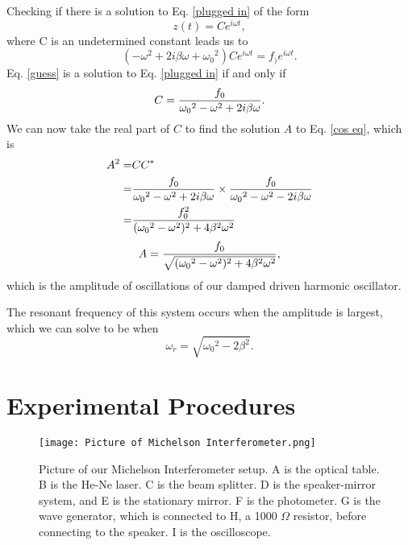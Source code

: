 \documentclass[11pt,letterpaper]{article}
\begin{document}
Checking if there is a solution to Eq. \eqref{plugged in} of the form
\begin{equation}
    z(t) = Ce^{i \omega t} , \label{guess}
\end{equation}
where C is an undetermined constant leads us to
\begin{equation}
    (-\omega ^2 + 2 i \beta \omega + {\omega _0}^2) C e^{i \omega t} = f_) e^{i \omega t} . 
\end{equation}
Eq. \eqref{guess} is a solution to Eq. \eqref{plugged in} if and only if
\begin{equation}
    C = {f_0 \over {\omega _0}^2 - \omega ^2 + 2 i \beta \omega} .
\end{equation}
We can now take the real part of $C$ to find the solution $A$ to Eq. \eqref{cos eq}, which is
\begin{align}
    A^2 = & CC^* \\
    = & {f_0 \over {\omega _0}^2 - \omega ^2 + 2 i \beta \omega} \times {f_0 \over {\omega _0}^2 - \omega ^2 - 2 i \beta \omega} \\
    = & {f_0^2 \over ({\omega _0}^2 - \omega ^2)^2 + 4 \beta ^2 \omega ^2}
\end{align}
\begin{equation}
    A = {f_0 \over \sqrt{({\omega _0}^2 - \omega ^2)^2 + 4 \beta ^2 \omega ^2}} , \label{Amplitude}
\end{equation}
which is the amplitude of oscillations of our damped driven harmonic oscillator.

The resonant frequency of this system occurs when the amplitude is largest, which we can solve to be when
\begin{equation}
    \omega _r = \sqrt{{\omega _0}^2 - 2 \beta ^2} . \label{resonant freq}
\end{equation}


\section{Experimental Procedures}

\begin{figure}
\centerline{\texttt{[image: Picture of Michelson Interferometer.png]}}
\caption{Picture of our Michelson Interferometer setup. A is the optical table. B is the He-Ne laser. C is the beam splitter. D is the speaker-mirror system, and E is the stationary mirror. F is the photometer. G is the wave generator, which is connected to H, a 1000 $\Omega$ resistor, before connecting to the speaker. I is the oscilloscope.} \label{setup picture}
\end{figure}
\end{document}

